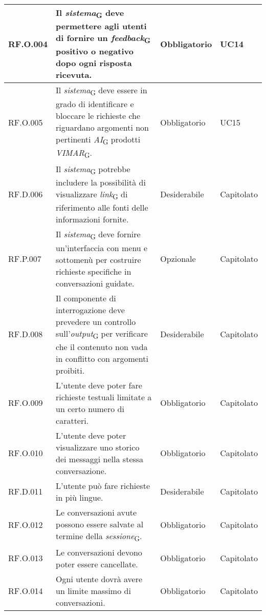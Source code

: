 \begin{table}[H]
\centering
    \begin{tabular}{|C{2.7cm}|L{7.2cm}|C{2.7cm}|C{2cm}|}
        \hline
        RF.O.004 & Il \textit{sistema}\textsubscript{G} deve permettere agli utenti di fornire un \textit{feedback}\textsubscript{G} positivo o negativo dopo ogni risposta ricevuta. & Obbligatorio & UC14 \\
        \hline
        RF.O.005 & Il \textit{sistema}\textsubscript{G} deve essere in grado di identificare e bloccare le richieste che riguardano argomenti non pertinenti \textit{AI}\textsubscript{G} prodotti \textit{VIMAR}\textsubscript{G}. & Obbligatorio & UC15 \\
        \hline
        RF.D.006 & Il \textit{sistema}\textsubscript{G} potrebbe includere la possibilità di visualizzare \textit{link}\textsubscript{G} di riferimento alle fonti delle informazioni fornite. & Desiderabile & Capitolato \\
        \hline
        RF.P.007 & Il \textit{sistema}\textsubscript{G} deve fornire un'interfaccia con menu e sottomenù per costruire richieste specifiche in conversazioni guidate. & Opzionale & Capitolato\\
        \hline
        RF.D.008 & Il componente di interrogazione deve prevedere un controllo sull’\textit{output}\textsubscript{G}
        per verificare che il contenuto non vada in conflitto con argomenti proibiti. & Desiderabile & Capitolato \\
        \hline
        RF.O.009 & L’utente deve poter fare richieste testuali limitate a un certo numero di caratteri. & Obbligatorio & Capitolato \\
        \hline
        RF.O.010 & L’utente deve poter visualizzare uno storico dei messaggi nella stessa
        conversazione. & Obbligatorio & Capitolato \\
        \hline
        RF.D.011 & L’utente può fare richieste in più lingue.
         & Desiderabile & Capitolato \\
         \hline
         RF.O.012 & Le conversazioni avute possono essere salvate al termine della \textit{sessione}\textsubscript{G}. & Obbligatorio & Capitolato \\
        \hline
        RF.O.013 & Le conversazioni devono poter essere cancellate. & Obbligatorio & Capitolato \\
        \hline
        RF.O.014 & Ogni utente dovrà avere un limite massimo di conversazioni.
         & Obbligatorio & Capitolato \\

\end{tabular}
\end{table}
